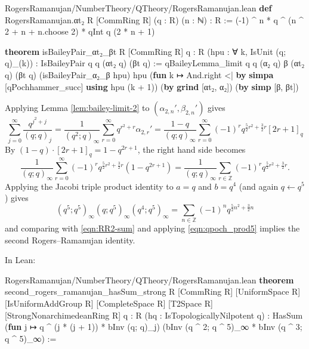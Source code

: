 \documentclass[12pt]{amsart}
\theoremstyle{definition}
\theoremstyle{remark}
\numberwithin{equation}{subsection}
\newcommand{\kw}[1]{\textcolor{keywordcolor}{\textbf{#1}}}
\newcommand{\var}[1]{\textcolor{tacticcolor}{#1}}
\newcommand{\prop}[1]{\textcolor{sortcolor}{#1}}
\newcommand{\num}[1]{\textcolor{numcolor}{#1}}
\newcommand{\imp}[1]{\textcolor{commentcolor}{\textbraceleft#1\textbraceright}}
\begin{document}
\begin{code}{RogersRamanujan/NumberTheory/QTheory/RogersRamanujan.lean}
\kw{def} RogersRamanujan.αt₂ \imp{R} [CommRing \var{R}] (\var{q} : \var{R}) (\var{n} : ℕ) : \var{R} :=
  (-\num{1}) ^ \var{n} * \var{q} ^ (\var{n} ^ \num{2} + \var{n} + \var{n}.\prop{choose} \num{2}) * qInt \var{q} (\num{2} * \var{n} + \num{1})

\kw{theorem} isBaileyPair_αt₂_βt \imp{R} [CommRing \var{R}] \imp{q : R} (\var{hpu} : ∀ \var{k}, IsUnit (\var{q}; \var{q})_(\var{k})) :
    IsBaileyPair \var{q} \var{q} (αt₂ \var{q}) (βt \var{q}) :=
  qBaileyLemma_limit \var{q} \var{q} (α₂ \var{q}) β (αt₂ \var{q}) (βt \var{q}) (isBaileyPair_α₂_β \var{hpu}) \var{hpu}
    (\kw{fun} \var{k} ↦ And.right <| \kw{by} \kw{simpa} [qPochhammer_succ] \kw{using} \var{hpu} (\var{k} + \num{1}))
    (\kw{by} \kw{grind} [αt₂, α₂]) (\kw{by} \kw{simp} [β, βt])
\end{code}
Applying Lemma \ref{lem:bailey-limit-2} to $(\alpha_{2,n}', \beta_{2,n}')$ gives
\begin{equation}
    \sum_{j=0}^{\infty} \frac{q^{j^2 + j}}{(q;q)_j} = \frac{1}{(q^2;q)_\infty} \sum_{r=0}^{\infty} q^{r^2 + r} \alpha_{2,r}' = \frac{1 - q}{(q;q)_\infty} \sum_{r=0}^{\infty}(-1)^r q^{\frac{5}{2}r^2 + \frac{3}{2}r} [2r+1]_q
\end{equation}
By $(1 - q) \cdot [2r+1]_q = 1 - q^{2r+1}$, the right hand side becomes
\begin{equation}
\label{eqn:RR2-sum}
    \frac{1}{(q;q)_\infty} \sum_{r =0}^{\infty} (-1)^r q^{\frac{5}{2}r^2 + \frac{3}{2}r} (1 - q^{2r + 1}) = \frac{1}{(q;q)_\infty} \sum_{r \in \mathbb{Z}} (-1)^r q^{\frac{5}{2}r^2 + \frac{3}{2}r}.
\end{equation}
Applying the Jacobi triple product identity to $a = q$ and $b = q^4$ (and again $q \leftarrow q^5$) gives
\begin{equation}
\label{eqn:RR2-JTP}
    (q^5;q^5)_\infty (q;q^5)_\infty (q^4;q^5)_\infty = \sum_{n \in \mathbb{Z}} (-1)^n q^{\frac{5}{2}n^2 + \frac{3}{2}n}
\end{equation}
and comparing with \eqref{eqn:RR2-sum} and applying \eqref{eqn:qpoch_prod5} implies the second Rogers--Ramanujan identity.

In Lean:

\begin{code}{RogersRamanujan/NumberTheory/QTheory/RogersRamanujan.lean}
\kw{theorem} second_rogers_ramanujan_hasSum_strong \imp{R} [CommRing \var{R}] [UniformSpace \var{R}]
  [IsUniformAddGroup \var{R}] [CompleteSpace \var{R}] [T2Space \var{R}] [StrongNonarchimedeanRing \var{R}]
  \imp{q : R} (\var{hq} : IsTopologicallyNilpotent \var{q}) :
  HasSum (\kw{fun} \var{j} ↦ \var{q} ^ (\var{j} * (\var{j} + \num{1})) * bInv (\var{q}; \var{q})_\var{j})
    (bInv (\var{q} ^ \num{2}; \var{q} ^ \num{5})_∞ * bInv (\var{q} ^ \num{3}; \var{q} ^ \num{5})_∞) :=
\end{code}
\end{document}
